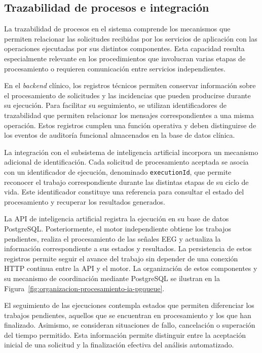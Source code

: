 \subsection{Trazabilidad de procesos e integración}
\label{subsec:trazabilidad-procesos-integracion}

La trazabilidad de procesos en el sistema comprende los mecanismos
que permiten relacionar las solicitudes recibidas por los
servicios de aplicación con las operaciones ejecutadas por
sus distintos componentes. Esta capacidad resulta especialmente
relevante en los procedimientos que involucran varias etapas
de procesamiento o requieren comunicación entre servicios
independientes.

En el \textit{backend} clínico, los registros técnicos permiten
conservar información sobre el procesamiento de solicitudes
y las incidencias que pueden producirse durante su ejecución.
Para facilitar su seguimiento, se utilizan identificadores
de trazabilidad que permiten relacionar los mensajes
correspondientes a una misma operación. Estos registros
cumplen una función operativa y deben distinguirse de los
eventos de auditoría funcional almacenados en la base de
datos clínica.

La integración con el subsistema de inteligencia artificial
incorpora un mecanismo adicional de identificación. Cada
solicitud de procesamiento aceptada se asocia con un
identificador de ejecución, denominado
\texttt{executionId}, que permite reconocer el trabajo
correspondiente durante las distintas etapas de su ciclo
de vida. Este identificador constituye una referencia
para consultar el estado del procesamiento y recuperar
los resultados generados.

La API de inteligencia artificial registra la ejecución
en su base de datos PostgreSQL. Posteriormente, el motor
independiente obtiene los trabajos pendientes, realiza
el procesamiento de las señales EEG y actualiza la
información correspondiente a sus estados y resultados.
La persistencia de estos registros permite seguir
el avance del trabajo sin depender de una conexión
HTTP continua entre la API y el motor. La organización
de estos componentes y su mecanismo de coordinación
mediante PostgreSQL se ilustran en la
Figura~\ref{fig:organizacion-procesamiento-ia-pgqueue}.


El seguimiento de las ejecuciones contempla estados
que permiten diferenciar los trabajos pendientes,
aquellos que se encuentran en procesamiento y los
que han finalizado. Asimismo, se consideran situaciones
de fallo, cancelación o superación del tiempo permitido.
Esta información permite distinguir entre la aceptación
inicial de una solicitud y la finalización efectiva
del análisis automatizado.

